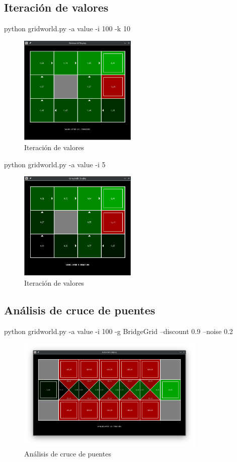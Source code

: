 \documentclass{report}
\begin{document}
      \subsection{Iteración de valores} %
        python gridworld.py -a value -i 100 -k 10
        \begin{figure}[H]
          \centering
          \includegraphics[width=0.5\textwidth]{./.img/ej11.png}
          \caption{Iteración de valores}
        \end{figure}
        python gridworld.py -a value -i 5
        \begin{figure}[H]
          \centering
          \includegraphics[width=0.5\textwidth]{./.img/ej12.png}
          \caption{Iteración de valores}
        \end{figure}
        \clearpage
      \subsection{Análisis de cruce de puentes} %
        python gridworld.py -a value -i 100 -g BridgeGrid --discount 0.9 --noise 0.2
        \begin{figure}[H]
          \centering
          \includegraphics[width=0.8\textwidth]{./.img/ej21.png}
          \caption{Análisis de cruce de puentes}
        \end{figure}
        \clearpage
\end{document}
